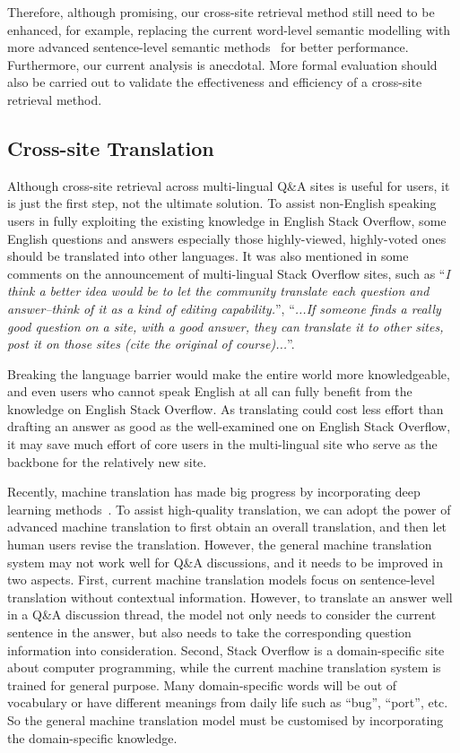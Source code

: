 Therefore, although promising, our cross-site retrieval method still need to be enhanced, for example, replacing the current word-level semantic modelling with more advanced sentence-level semantic methods~\cite{kiros2015skip, conneau2017supervised} for better performance. 
Furthermore, our current analysis is anecdotal.
More formal evaluation should also be carried out to validate the effectiveness and efficiency of a cross-site retrieval method.

\subsection{Cross-site Translation}
\label{sec:crossTranslation}
Although cross-site retrieval across multi-lingual Q\&A sites is useful for users, it is just the first step, not the ultimate solution.
To assist non-English speaking users in fully exploiting the existing knowledge in English Stack Overflow, some English questions and answers especially those highly-viewed, highly-voted ones should be translated into other languages.
It was also mentioned in some comments on the announcement of multi-lingual Stack Overflow sites, such as ``\textit{I think a better idea would be to let the community translate each question and answer--think of it as a kind of editing capability.}'', ``\textit{...If someone finds a really good question on a site, with a good answer, they can translate it to other sites, post it on those sites (cite the original of course)...}''.

Breaking the language barrier would make the entire world more knowledgeable, and even users who cannot speak English at all can fully benefit from the knowledge on English Stack Overflow.
As translating could cost less effort than drafting an answer as good as the well-examined one on English Stack Overflow, it may save much effort of core users in the multi-lingual site who serve as the backbone for the relatively new site.

Recently, machine translation has made big progress by incorporating deep learning methods~\cite{wu2016google, sutskever2014sequence}. 
To assist high-quality translation, we can adopt the power of advanced machine translation to first obtain an overall translation, and then let human users revise the translation.
However, the general machine translation system may not work well for Q\&A discussions, and it needs to be improved in two aspects.
First, current machine translation models focus on sentence-level translation without contextual information.
However, to translate an answer well in a Q\&A discussion thread, the model not only needs to consider the current sentence in the answer, but also needs to take the corresponding question information into consideration.
Second, Stack Overflow is a domain-specific site about computer programming, while the current machine translation system is trained for general purpose.
Many domain-specific words will be out of vocabulary or have different meanings from daily life such as ``bug'', ``port'', etc.
So the general machine translation model must be customised by incorporating the domain-specific knowledge.

